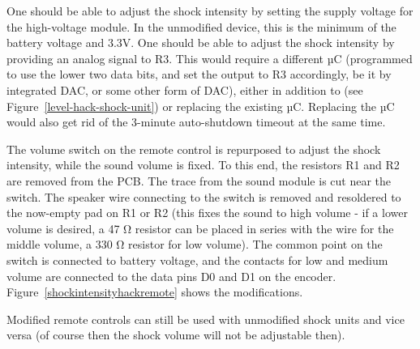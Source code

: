 \documentclass[a4paper]{article}
\begin{document}
One should be able to adjust the shock intensity by setting the supply voltage for the high-voltage module. In the unmodified device, this is the minimum of the battery voltage and 3.3V. One should be able to adjust the shock intensity by providing an analog signal to R3. This would require a different µC (programmed to use the lower two data bits, and set the output to R3 accordingly, be it by integrated DAC, or some other form of DAC), either in addition to (see Figure~\ref{level-hack-shock-unit}) or replacing the existing µC. Replacing the µC would also get rid of the 3-minute auto-shutdown timeout at the same time.

The volume switch on the remote control is repurposed to adjust the shock intensity, while the sound volume is fixed. To this end, the resistors R1 and R2 are removed from the PCB. The trace from the sound module is cut near the switch. The speaker wire connecting to the switch is removed and resoldered to the now-empty pad on R1 or R2 (this fixes the sound to high volume - if a lower volume is desired, a 47 \si{\ohm} resistor can be placed in series with the wire for the middle volume, a 330 \si{\ohm} resistor for low volume). The common point on the switch is connected to battery voltage, and the contacts for low and medium volume are connected to the data pins D0 and D1 on the encoder. Figure~\ref{shockintensityhackremote} shows the modifications.

Modified remote controls can still be used with unmodified shock units and vice versa (of course then the shock volume will not be adjustable then).



\end{document}
